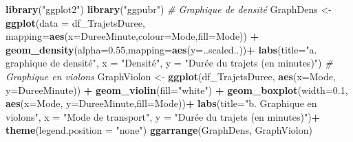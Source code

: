 \documentclass[
  11pt,
  french,
]{book}
\makeatletter
\newenvironment{Shaded}{\begin{snugshade}}{\end{snugshade}}
\newcommand{\CommentTok}[1]{\textcolor[rgb]{0.56,0.35,0.01}{\textit{#1}}}
\newcommand{\DataTypeTok}[1]{\textcolor[rgb]{0.13,0.29,0.53}{#1}}
\newcommand{\FloatTok}[1]{\textcolor[rgb]{0.00,0.00,0.81}{#1}}
\newcommand{\KeywordTok}[1]{\textcolor[rgb]{0.13,0.29,0.53}{\textbf{#1}}}
\newcommand{\NormalTok}[1]{#1}
\newcommand{\OperatorTok}[1]{\textcolor[rgb]{0.81,0.36,0.00}{\textbf{#1}}}
\newcommand{\StringTok}[1]{\textcolor[rgb]{0.31,0.60,0.02}{#1}}
\newenvironment{kframe}{%
\medskip{}
\setlength{\fboxsep}{.8em}
 \def\at@end@of@kframe{}%
 \ifinner\ifhmode%
  \def\at@end@of@kframe{\end{minipage}}%
  \begin{minipage}{\columnwidth}%
 \fi\fi%
 \def\FrameCommand##1{\hskip\@totalleftmargin \hskip-\fboxsep
 \colorbox{shadecolor}{##1}\hskip-\fboxsep
     \hskip-\linewidth \hskip-\@totalleftmargin \hskip\columnwidth}%
 \MakeFramed {\advance\hsize-\width
   \@totalleftmargin\z@ \linewidth\hsize
   \@setminipage}}%
 {\par\unskip\endMakeFramed%
 \at@end@of@kframe}
\renewenvironment{Shaded}{\begin{kframe}}{\end{kframe}}
\makeatother
\begin{document}
\begin{Shaded}
\begin{Highlighting}[]
\KeywordTok{library}\NormalTok{(}\StringTok{"ggplot2"}\NormalTok{)}
\KeywordTok{library}\NormalTok{(}\StringTok{"ggpubr"}\NormalTok{)}
\CommentTok{# Graphique de densité}
\NormalTok{GraphDens <-}\StringTok{ }\KeywordTok{ggplot}\NormalTok{(}\DataTypeTok{data =}\NormalTok{ df_TrajetsDuree, }
  \DataTypeTok{mapping=}\KeywordTok{aes}\NormalTok{(}\DataTypeTok{x=}\NormalTok{DureeMinute,}\DataTypeTok{colour=}\NormalTok{Mode,}\DataTypeTok{fill=}\NormalTok{Mode)) }\OperatorTok{+}
\StringTok{  }\KeywordTok{geom_density}\NormalTok{(}\DataTypeTok{alpha=}\FloatTok{0.55}\NormalTok{,}\DataTypeTok{mapping=}\KeywordTok{aes}\NormalTok{(}\DataTypeTok{y=}\NormalTok{..scaled..))}\OperatorTok{+}
\StringTok{    }\KeywordTok{labs}\NormalTok{(}\DataTypeTok{title=}\StringTok{"a. graphique de densité"}\NormalTok{,}
         \DataTypeTok{x =} \StringTok{"Densité"}\NormalTok{,}
         \DataTypeTok{y =} \StringTok{"Durée du trajets (en minutes)"}\NormalTok{)}
\CommentTok{# Graphique en violons}
\NormalTok{GraphViolon <-}\StringTok{ }\KeywordTok{ggplot}\NormalTok{(df_TrajetsDuree, }\KeywordTok{aes}\NormalTok{(}\DataTypeTok{x=}\NormalTok{Mode, }\DataTypeTok{y=}\NormalTok{DureeMinute)) }\OperatorTok{+}
\StringTok{  }\KeywordTok{geom_violin}\NormalTok{(}\DataTypeTok{fill=}\StringTok{"white"}\NormalTok{) }\OperatorTok{+}
\StringTok{  }\KeywordTok{geom_boxplot}\NormalTok{(}\DataTypeTok{width=}\FloatTok{0.1}\NormalTok{, }\KeywordTok{aes}\NormalTok{(}\DataTypeTok{x=}\NormalTok{Mode, }\DataTypeTok{y=}\NormalTok{DureeMinute,}\DataTypeTok{fill=}\NormalTok{Mode))}\OperatorTok{+}
\StringTok{  }\KeywordTok{labs}\NormalTok{(}\DataTypeTok{title=}\StringTok{"b. Graphique en violons"}\NormalTok{,}
       \DataTypeTok{x =} \StringTok{"Mode de transport"}\NormalTok{,}
       \DataTypeTok{y =} \StringTok{"Durée du trajets (en minutes)"}\NormalTok{)}\OperatorTok{+}
\StringTok{  }\KeywordTok{theme}\NormalTok{(}\DataTypeTok{legend.position =} \StringTok{"none"}\NormalTok{)}
\KeywordTok{ggarrange}\NormalTok{(GraphDens, GraphViolon)}
\end{Highlighting}
\end{Shaded}
\end{document}
